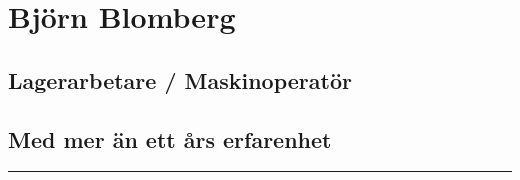\documentclass{article}
\begin{document}
	
	\begin{minipage}[t]{0.7\textwidth}
		\titleformat{\section}{\Huge\bfseries}{\thesection}{1em}{}
		\section*{\textcolor{colorBlue}{Björn Blomberg}}
		\subsection*{\textcolor{colorTitelErfarenhet}{Lagerarbetare / Maskinoperatör}}
		\subsection*{Med mer än ett års erfarenhet}
		\rule{10cm}{0.4pt}
		\titleformat{\section}{\Large\bfseries}{\thesection}{1em}{}
		\vspace{1.5cm}
	\end{minipage}%
	\begin{minipage}[t]{0.3\textwidth}
		\vspace{-10pt} %
	\end{minipage}%
	
\end{document}
